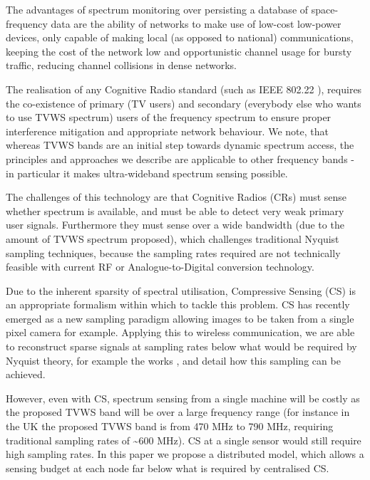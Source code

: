 \documentclass[conference]{IEEEtran}
\begin{document}
The advantages of spectrum monitoring \cite{akan2009cognitive} over persisting a database of space-frequency data are the ability of networks to make use of low-cost low-power devices, only capable of making local (as opposed to national) communications, keeping the cost of the network low and  opportunistic channel usage for bursty traffic, reducing channel collisions in dense networks.

The realisation of any Cognitive Radio standard (such as IEEE 802.22 \cite{stevenson2009ieee}), requires the co-existence of primary (TV users) and secondary (everybody else who wants to use TVWS spectrum) users of the frequency spectrum to ensure proper interference mitigation and appropriate network behaviour. We note, that whereas TVWS bands are an initial step towards dynamic spectrum access, the principles and approaches we describe are applicable to other frequency bands - in particular it makes ultra-wideband spectrum sensing possible.

The challenges of this technology are that Cognitive Radios (CRs) must sense whether spectrum is available, and must be able to detect very weak primary user signals. Furthermore they must sense over a wide bandwidth (due to the amount of TVWS spectrum proposed), which challenges traditional Nyquist sampling techniques, because the sampling rates required are not technically feasible with current RF or Analogue-to-Digital conversion technology.

Due to the inherent sparsity of spectral utilisation, Compressive Sensing (CS) \cite{Candes2006} is an appropriate formalism within which to tackle this problem. CS has recently emerged as a new sampling paradigm allowing images to be taken from a single pixel camera for example. Applying this to wireless communication, we are able to reconstruct sparse signals at sampling rates below what would be required by Nyquist theory, for example the works \cite{mishali2010theory}, and \cite{tropp2010beyond} detail how this sampling can be achieved. 

However, even with CS, spectrum sensing from a single machine will be costly as the proposed TVWS band will be over a large frequency range (for instance in the UK the proposed TVWS band is from 470 MHz to 790 MHz, requiring traditional sampling rates of \textasciitilde 600 MHz). CS at a single sensor would still require high sampling rates. In this paper we propose a distributed model, which allows a sensing budget at each node far below what is required by centralised CS.
\end{document}
